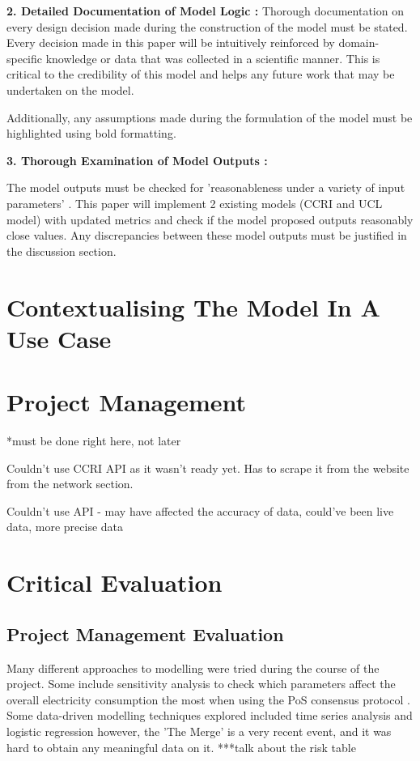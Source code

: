 \textbf{2. Detailed Documentation of Model Logic :}
Thorough documentation on every design decision made during the construction of the model must be stated. Every decision made in this paper will be intuitively reinforced by domain-specific knowledge or data that was collected in a scientific manner. This is critical to the credibility of this model and helps any future work that may be undertaken on the model.

Additionally, any assumptions made during the formulation of the model must be highlighted using bold formatting.


\textbf{3. Thorough Examination of Model Outputs :}

The model outputs must be checked for 'reasonableness under a variety of input parameters' \cite{Al-Aomar2015ModelTechniques}. This paper will implement 2 existing models (CCRI and UCL model) with updated metrics and check if the model proposed outputs reasonably close values. Any discrepancies between these model outputs must be justified in the discussion section.   




\section {Contextualising The Model In A Use Case}

\section {Project Management}
*must be done right here, not later

Couldn't use CCRI API as it wasn't ready yet. Has to scrape it from the website from the network section.

Couldn't use API - may have affected the accuracy of data, could've been live data, more precise data

\section{Critical Evaluation}

\subsection{Project Management Evaluation}

Many different approaches to modelling were tried during the course of the project. Some include sensitivity analysis to check which parameters affect the overall electricity consumption the most when using the PoS consensus protocol \cite{MarionAnModelling}. Some data-driven modelling techniques explored included time series analysis and logistic regression \cite{IbanezTheExpansion} however, the 'The Merge' is a very recent event, and it was hard to obtain any meaningful data on it.  ***talk about the risk table

